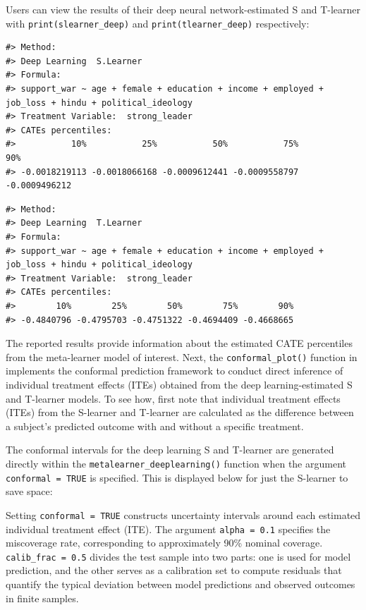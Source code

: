 Users can view the results of their deep neural network-estimated S and
T-learner with \texttt{print(slearner\_deep)} and \texttt{print(tlearner\_deep)}
respectively:

\begin{verbatim}
#> Method:
#> Deep Learning  S.Learner
#> Formula:
#> support_war ~ age + female + education + income + employed +      job_loss + hindu + political_ideology
#> Treatment Variable:  strong_leader
#> CATEs percentiles:
#>           10%           25%           50%           75%           90% 
#> -0.0018219113 -0.0018066168 -0.0009612441 -0.0009558797 -0.0009496212
\end{verbatim}

\begin{verbatim}
#> Method:
#> Deep Learning  T.Learner
#> Formula:
#> support_war ~ age + female + education + income + employed +      job_loss + hindu + political_ideology
#> Treatment Variable:  strong_leader
#> CATEs percentiles:
#>        10%        25%        50%        75%        90% 
#> -0.4840796 -0.4795703 -0.4751322 -0.4694409 -0.4668665
\end{verbatim}

The reported results provide information about the estimated CATE
percentiles from the meta-learner model of interest. Next, the
\texttt{conformal\_plot()} function in  implements the
conformal prediction framework to conduct direct inference of individual
treatment effects (ITEs) obtained from the deep learning-estimated S and
T-learner models. To see how, first note that individual treatment
effects (ITEs) from the S-learner and T-learner are calculated as the
difference between a subject's predicted outcome with and without a
specific treatment.

The conformal intervals for the deep learning S and T-learner are
generated directly within the \texttt{metalearner\_deeplearning()} function when
the argument \texttt{conformal\ =\ TRUE} is specified. This is displayed below
for just the S-learner to save space:

Setting \texttt{conformal\ =\ TRUE} constructs uncertainty intervals around each
estimated individual treatment effect (ITE). The argument \texttt{alpha\ =\ 0.1}
specifies the miscoverage rate, corresponding to approximately 90\%
nominal coverage. \texttt{calib\_frac\ =\ 0.5} divides the test sample into two
parts: one is used for model prediction, and the other serves as a
calibration set to compute residuals that quantify the typical deviation
between model predictions and observed outcomes in finite samples.

